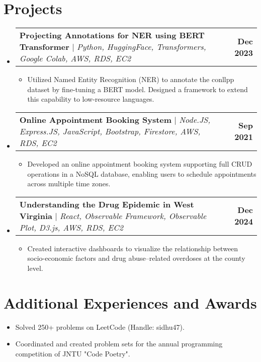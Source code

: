 \documentclass[letterpaper,10.5pt]{article}
\makeatletter
\newcommand{\resumeItem}[1]{%
  \item\small{#1}
}
\newcommand{\resumeProjectHeading}[2]{%
  \item
  \begin{tabular*}{1.001\textwidth}{l@{\extracolsep{\fill}}r}
    \small #1 & \textbf{\small #2} \\
  \end{tabular*}
}
\newcommand{\resumeSubHeadingListStart}{\begin{itemize}[leftmargin=0.0in, label={}]}
\newcommand{\resumeSubHeadingListEnd}{\end{itemize}}
\newcommand{\resumeItemListStart}{\begin{itemize}}
\newcommand{\resumeItemListEnd}{\end{itemize}}
\makeatother
\begin{document}
\section{Projects}
\resumeSubHeadingListStart
\resumeProjectHeading
          {\textbf{Projecting Annotations for NER using BERT Transformer} $|$ \emph{Python, HuggingFace, Transformers, Google Colab, AWS, RDS, EC2}}{Dec 2023}
          \resumeItemListStart
              \resumeItem{Utilized Named Entity Recognition (NER) to annotate the conllpp dataset by fine-tuning a BERT model. Designed a framework to extend this capability to low-resource languages.}
          \resumeItemListEnd
\resumeProjectHeading
          {\textbf{Online Appointment Booking System} $|$ \emph{Node.JS, Express.JS, JavaScript, Bootstrap, Firestore, AWS, RDS, EC2}}{Sep 2021}
          \resumeItemListStart
              \resumeItem{Developed an online appointment booking system supporting full CRUD operations in a NoSQL database, enabling users to schedule appointments across multiple time zones.}
          \resumeItemListEnd
\resumeProjectHeading
          {\textbf{Understanding the Drug Epidemic in West Virginia} $|$ \emph{React, Observable Framework, Observable Plot, D3.js, AWS, RDS, EC2}}{Dec 2024}
          \resumeItemListStart
              \resumeItem{Created interactive dashboards to visualize the relationship between socio-economic factors and drug abuse–related overdoses at the county level.}
          \resumeItemListEnd
\resumeSubHeadingListEnd

\section{Additional Experiences and Awards}
\resumeSubHeadingListStart
\resumeItemListStart
\resumeItem{Solved 250+ problems on LeetCode (Handle: sidhu47).}
\resumeItem{Coordinated and created problem sets for the annual programming competition of JNTU "Code Poetry".}
\resumeItemListEnd
\resumeSubHeadingListEnd
\end{document}
